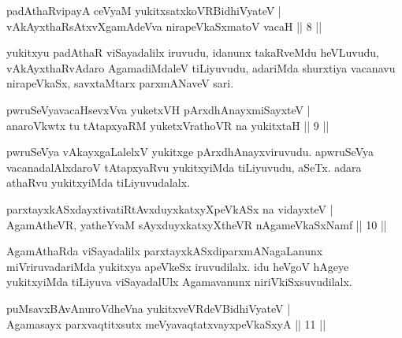 

\begin{shl}
padAthaRvipayA ceVyaM yukitxsatxkoVR\s BidhiVyateV |\\
vAkAyxthaRsAtxvXgamAdeVva nirapeVkaSxmatoV vacaH \hfill || 8 ||
\end{shl}

\begin{artha}
yukitxyu padAthaR viSayadalilx iruvudu, idanunx takaRveMdu heVLu\-vudu, vAkAyxthaRvAdaro AgamadiMdaleV tiLiyuvudu, adariMda shurxtiya vacanavu nirapeVkaSx, savxtaMtarx parxmANaveV sari.
\end{artha}


\begin{shl}
pwruSeVyavacaHsevxVva yuketxVH pArxdhAnayxmiSayxteV |\\
anaroVkwtx tu tAtapxyaRM yuketxVrathoVR na yukitxtaH \hfill || 9 ||
\end{shl}

\begin{artha}
pwruSeVya vAkayxgaLalelxV yukitxge pArxdhAnayxviruvudu. apwruSeVya vacanadalAlxdaroV tAtapxyaRvu yukitxyiMda tiLiyuvudu, aSeTx. adara athaRvu yukitxyiMda tiLiyuvudalalx.
\end{artha}

\begin{shl}
parxtayxkASxdayxtivatiRtAvxduyxkatxyXpeVkASx na vidayxteV |\\
AgamAtheVR, yatheYvaM sAyxduyxkatxyXtheVR nA\s \s gameVkaSxNamf \hfill || 10 || 
\end{shl}

\begin{artha}
AgamAthaRda viSayadalilx parxtayxkASxdiparxmANagaLanunx miVriruvadariMda \-yukitxya apeVkeSx iruvudilalx. idu heVgoV hAgeye yukitxyiMda tiLiyuva viSayadalUlx Agamavanunx niriVkiSxsuvudilalx.
\end{artha}


\begin{shl}
puMsavxBAvAnuroVdheVna yukitxveVRdeV\s BidhiVyateV |\\
Agamasayx parxvaqtitxsutx meVyavaqtatxvayxpeVkaSxyA \hfill || 11 ||
\end{shl}

